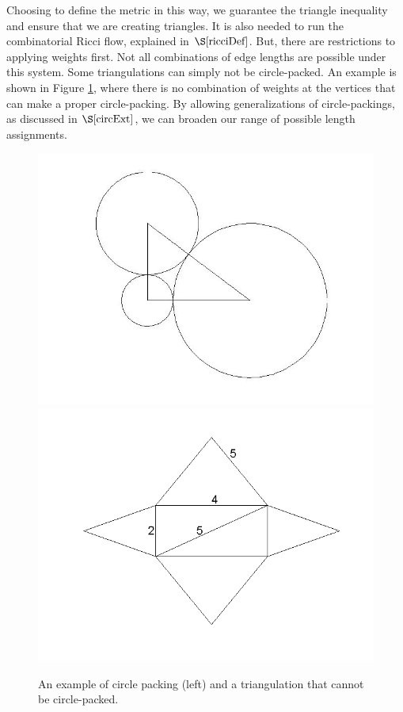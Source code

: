 \documentclass[12pt]{article}
\begin{document}
\noindent Choosing to define the metric in this way, we guarantee the triangle inequality and ensure that we are creating triangles. It is also needed to run the combinatorial Ricci flow, explained in $\S\ref{ricciDef}$. But, there are restrictions to applying weights first. Not all combinations of edge lengths are possible under this system. Some triangulations can simply not be circle-packed. An example is shown in Figure \ref{rightTri}, where there is no combination of weights at the vertices that can make a proper circle-packing. By allowing generalizations of circle-packings, as discussed in $\S\ref{circExt}$, we can broaden our range of possible length assignments.

  
\begin{figure}
\includegraphics[scale = 0.3]{Pictures/righttriangulation.jpg}
\includegraphics[scale = 0.5]{Pictures/badcase2.png}
\caption{An example of circle packing (left) and a triangulation that cannot be circle-packed.}
\label{rightTri}
\end{figure}
\end{document}
